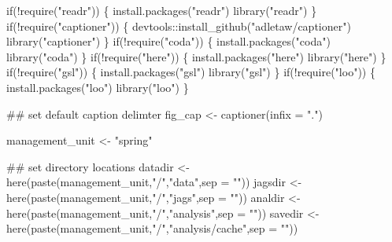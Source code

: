 \documentclass[
  11pt,
]{article}
\newenvironment{Shaded}{}{}
\newcommand{\CommentTok}[1]{\textcolor[rgb]{0.00,0.50,0.00}{#1}}
\newcommand{\ControlFlowTok}[1]{\textcolor[rgb]{0.00,0.00,1.00}{#1}}
\newcommand{\DataTypeTok}[1]{#1}
\newcommand{\KeywordTok}[1]{\textcolor[rgb]{0.00,0.00,1.00}{#1}}
\newcommand{\NormalTok}[1]{#1}
\newcommand{\OperatorTok}[1]{#1}
\newcommand{\StringTok}[1]{\textcolor[rgb]{0.00,0.50,0.50}{#1}}
\begin{document}
\begin{Shaded}
\begin{Highlighting}[]
\ControlFlowTok{if}\NormalTok{(}\OperatorTok{!}\KeywordTok{require}\NormalTok{(}\StringTok{"readr"}\NormalTok{)) \{}
  \KeywordTok{install.packages}\NormalTok{(}\StringTok{"readr"}\NormalTok{)}
  \KeywordTok{library}\NormalTok{(}\StringTok{"readr"}\NormalTok{)}
\NormalTok{\}}
\ControlFlowTok{if}\NormalTok{(}\OperatorTok{!}\KeywordTok{require}\NormalTok{(}\StringTok{"captioner"}\NormalTok{)) \{}
\NormalTok{  devtools}\OperatorTok{::}\KeywordTok{install_github}\NormalTok{(}\StringTok{"adletaw/captioner"}\NormalTok{)}
  \KeywordTok{library}\NormalTok{(}\StringTok{"captioner"}\NormalTok{)}
\NormalTok{\}}
\ControlFlowTok{if}\NormalTok{(}\OperatorTok{!}\KeywordTok{require}\NormalTok{(}\StringTok{"coda"}\NormalTok{)) \{}
  \KeywordTok{install.packages}\NormalTok{(}\StringTok{"coda"}\NormalTok{)}
  \KeywordTok{library}\NormalTok{(}\StringTok{"coda"}\NormalTok{)}
\NormalTok{\}}
\ControlFlowTok{if}\NormalTok{(}\OperatorTok{!}\KeywordTok{require}\NormalTok{(}\StringTok{"here"}\NormalTok{)) \{}
  \KeywordTok{install.packages}\NormalTok{(}\StringTok{"here"}\NormalTok{)}
  \KeywordTok{library}\NormalTok{(}\StringTok{"here"}\NormalTok{)}
\NormalTok{\}}
\ControlFlowTok{if}\NormalTok{(}\OperatorTok{!}\KeywordTok{require}\NormalTok{(}\StringTok{"gsl"}\NormalTok{)) \{}
  \KeywordTok{install.packages}\NormalTok{(}\StringTok{"gsl"}\NormalTok{)}
  \KeywordTok{library}\NormalTok{(}\StringTok{"gsl"}\NormalTok{)}
\NormalTok{\}}
\ControlFlowTok{if}\NormalTok{(}\OperatorTok{!}\KeywordTok{require}\NormalTok{(}\StringTok{"loo"}\NormalTok{)) \{}
  \KeywordTok{install.packages}\NormalTok{(}\StringTok{"loo"}\NormalTok{)}
  \KeywordTok{library}\NormalTok{(}\StringTok{"loo"}\NormalTok{)}
\NormalTok{\}}

\CommentTok{## set default caption delimter}
\NormalTok{fig_cap <-}\StringTok{ }\KeywordTok{captioner}\NormalTok{(}\DataTypeTok{infix =} \StringTok{"."}\NormalTok{)}

\NormalTok{management_unit <-}\StringTok{ "spring"}

\CommentTok{## set directory locations}
\NormalTok{datadir <-}\StringTok{ }\KeywordTok{here}\NormalTok{(}\KeywordTok{paste}\NormalTok{(management_unit,}\StringTok{"/"}\NormalTok{,}\StringTok{"data"}\NormalTok{,}\DataTypeTok{sep =} \StringTok{""}\NormalTok{))}
\NormalTok{jagsdir <-}\StringTok{ }\KeywordTok{here}\NormalTok{(}\KeywordTok{paste}\NormalTok{(management_unit,}\StringTok{"/"}\NormalTok{,}\StringTok{"jags"}\NormalTok{,}\DataTypeTok{sep =} \StringTok{""}\NormalTok{))}
\NormalTok{analdir <-}\StringTok{ }\KeywordTok{here}\NormalTok{(}\KeywordTok{paste}\NormalTok{(management_unit,}\StringTok{"/"}\NormalTok{,}\StringTok{"analysis"}\NormalTok{,}\DataTypeTok{sep =} \StringTok{""}\NormalTok{))}
\NormalTok{savedir <-}\StringTok{ }\KeywordTok{here}\NormalTok{(}\KeywordTok{paste}\NormalTok{(management_unit,}\StringTok{"/"}\NormalTok{,}\StringTok{"analysis/cache"}\NormalTok{,}\DataTypeTok{sep =} \StringTok{""}\NormalTok{))}


\end{Highlighting}
\end{Shaded}
\end{document}
